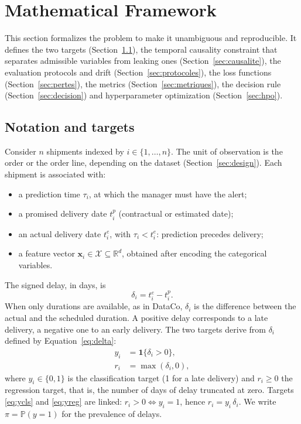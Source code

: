 \documentclass[11pt,a4paper]{article}
\newcommand{\Prob}{\mathbb{P}}
\newcommand{\ind}{\mathbf{1}}
\theoremstyle{definition}
\begin{document}
\section{Mathematical Framework}
\label{sec:formulation}

This section formalizes the problem to make it unambiguous and reproducible. It defines the two targets (Section~\ref{sec:notations}), the temporal causality constraint that separates admissible variables from leaking ones (Section~\ref{sec:causalite}), the evaluation protocols and drift (Section~\ref{sec:protocoles}), the loss functions (Section~\ref{sec:pertes}), the metrics (Section~\ref{sec:metriques}), the decision rule (Section~\ref{sec:decision}) and hyperparameter optimization (Section~\ref{sec:hpo}).

\subsection{Notation and targets}
\label{sec:notations}

Consider $n$ shipments indexed by $i \in \{1,\dots,n\}$. The unit of observation is the order or the order line, depending on the dataset (Section~\ref{sec:design}). Each shipment is associated with:
\begin{itemize}
  \item a prediction time $\tau_i$, at which the manager must have the alert;
  \item a promised delivery date $t_i^{p}$ (contractual or estimated date);
  \item an actual delivery date $t_i^{e}$, with $\tau_i < t_i^{e}$: prediction precedes delivery;
  \item a feature vector $\mathbf{x}_i \in \mathcal{X} \subseteq \mathbb{R}^{d}$, obtained after encoding the categorical variables.
\end{itemize}
The signed delay, in days, is
\begin{equation}
  \delta_i = t_i^{e} - t_i^{p}.
  \label{eq:delta}
\end{equation}
When only durations are available, as in DataCo, $\delta_i$ is the difference between the actual and the scheduled duration. A positive delay corresponds to a late delivery, a negative one to an early delivery. The two targets derive from $\delta_i$ defined by Equation~\eqref{eq:delta}:
\begin{align}
  y_i &= \ind\{\delta_i > 0\}, \label{eq:ycls}\\
  r_i &= \max(\delta_i, 0), \label{eq:yreg}
\end{align}
where $y_i \in \{0,1\}$ is the classification target (1 for a late delivery) and $r_i \ge 0$ the regression target, that is, the number of days of delay truncated at zero. Targets \eqref{eq:ycls} and \eqref{eq:yreg} are linked: $r_i > 0 \iff y_i = 1$, hence $r_i = y_i\,\delta_i$. We write $\pi = \Prob(y=1)$ for the prevalence of delays.
\end{document}
